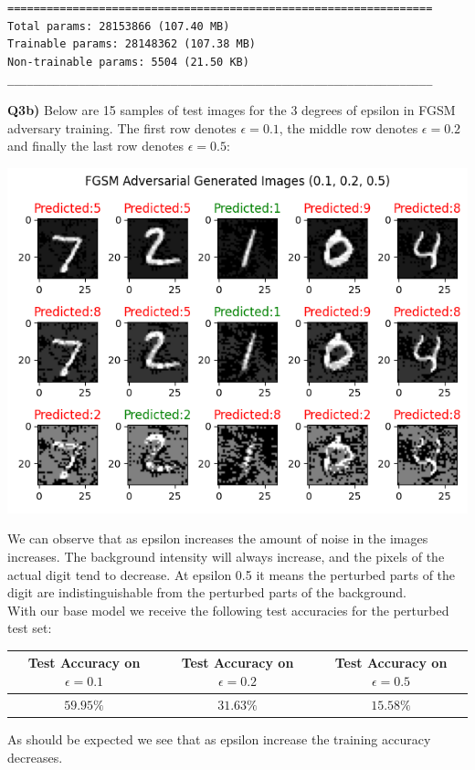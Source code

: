\documentclass{article}
\begin{document}
\begin{titlepage}
\begin{lstlisting}
=================================================================
Total params: 28153866 (107.40 MB)
Trainable params: 28148362 (107.38 MB)
Non-trainable params: 5504 (21.50 KB)
_________________________________________________________________
\end{lstlisting}
\newpage
\textbf{Q3b)} Below are 15 samples of test images for the 3 degrees of epsilon in FGSM adversary training. The first row denotes $\epsilon = 0.1$, the middle row denotes $\epsilon = 0.2$ and finally the last row denotes $\epsilon = 0.5$:
\begin{center}
\includegraphics[width=.8\linewidth]{q3bFGSM.png}
\end{center}
We can observe that as epsilon increases the amount of noise in the images increases. The background intensity will always increase, and the pixels of the actual digit tend to decrease. At epsilon 0.5 it means the perturbed parts of the digit are indistinguishable from the perturbed parts of the background. \\

With our base model we receive the following test accuracies for the perturbed test set:
\begin{center}
\begin{tabular}{||c | c |c ||} 
 \hline
 Test Accuracy on $ \epsilon = 0.1$ & Test Accuracy on $ \epsilon = 0.2$ & Test Accuracy on $ \epsilon = 0.5$ \\ [0.5ex] 
 \hline
 $59.95\%$ & $31.63\%$ & $15.58\%$ \\ 
 \hline
\end{tabular}
\end{center}
As should be expected we see that as epsilon increase the training accuracy decreases.  \\


\end{titlepage}
\end{document}
